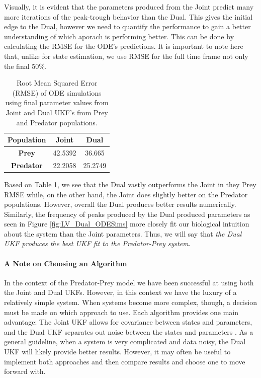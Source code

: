 Visually, it is evident that the parameters produced from the Joint predict many more iterations of the peak-trough behavior than the Dual. This gives the initial edge to the Dual, however we need to quantify the performance to gain a better understanding of which aporach is performing better. This can be done by calculating the RMSE for the ODE's predictions. It is important to note here that, unlike for state estimation, we use RMSE for the full time frame not only the final 50\%.

\begin{table}[H]
  \begin{center}
    \begin{tabular}{c|c|c} %
      \textbf{Population} & \textbf{Joint} & \textbf{Dual} \\
      \hline
      \textbf{Prey} & 42.5392 & 36.665\\
      \textbf{Predator} & 22.2058 & 25.2749
    \end{tabular}
    \caption{Root Mean Squared Error (RMSE) of ODE simulations using final parameter values from Joint and Dual UKF's from Prey and Predator populations.}
    \label{table:LV_ODESims_RMSE}
  \end{center}
\end{table}

Based on Table \ref{table:LV_ODESims_RMSE}, we see that the Dual vastly outperforms the Joint in they Prey RMSE while, on the other hand, the Joint does slightly better on the Predator populations. However, overall the Dual produces better results numerically. Similarly, the frequency of peaks produced by the Dual produced parameters as seen in Figure \ref{fig:LV_Dual_ODESims} more closely fit our biological intuition about the system than the Joint parameters. Thus, we will say that \emph{the Dual UKF produces the best UKF fit to the Predator-Prey system}.


\paragraph{A Note on Choosing an Algorithm}
In the context of the Predator-Prey model we have been successful at using both the Joint and Dual UKFs. However, in this context we have the luxury of a relatively simple system. When systems become more complex, though, a decision must be made on which approach to use. Each algorithm provides one main advantage: The Joint UKF allows for covariance between states and parameters, and the Dual UKF separates out noise between the states and parameters \cite{GoveHollingerDual}. As a general guideline, when a system is very complicated and data noisy, the Dual UKF will likely provide better results. However, it may often be useful to implement both approaches and then compare results and choose one to move forward with.
\\


